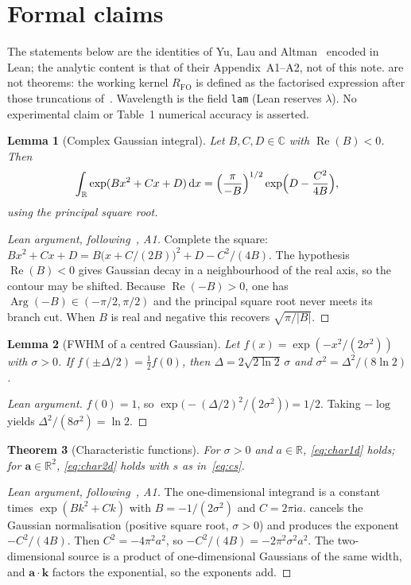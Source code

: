 \documentclass[11pt,a4paper]{article}
\newtheorem{theorem}{Theorem}[section]
\newtheorem{lemma}[theorem]{Lemma}
\theoremstyle{definition}
\theoremstyle{remark}
\DeclareMathOperator{\ReOp}{Re}
\DeclareMathOperator{\Arg}{Arg}
\newcommand{\R}{\mathbb{R}}
\newcommand{\C}{\mathbb{C}}
\newcommand{\dd}{\mathrm{d}}
\newcommand{\ii}{\mathrm{i}}
\newcommand{\abs}[1]{\lvert#1\rvert}
\newcommand{\RFO}{R_{\mathrm{FO}}}
\begin{document}
\appendix
\section{Formal claims}
\label{app:formal}

The statements below are the identities of Yu, Lau and
Altman~\cite{Yu2019} encoded in Lean; the analytic content is that of
their Appendix~A1--A2, not of this note.
 are not theorems: the working
kernel $\RFO$ is defined as the factorised expression after those
truncations of~\cite{Yu2019}.
Wavelength is the field \texttt{lam} (Lean reserves $\lambda$).
No experimental claim or Table~1 numerical accuracy is asserted.

\begin{lemma}[Complex Gaussian integral]
\label{lem:cgaussian}
Let $B,C,D\in\C$ with $\ReOp(B)<0$. Then
\begin{equation}
\label{eq:cgaussian}
\int_{\R}\exp(Bx^2+Cx+D)\,\dd x
=\Bigl(\frac{\pi}{-B}\Bigr)^{1/2}
\exp\Bigl(D-\frac{C^2}{4B}\Bigr),
\end{equation}
using the principal square root.
\end{lemma}
\begin{proof}[Lean argument, following~\cite{Yu2019}, A1]
Complete the square:
$Bx^2+Cx+D=B\bigl(x+C/(2B)\bigr)^2+D-C^2/(4B)$.
The hypothesis $\ReOp(B)<0$ gives Gaussian decay in a neighbourhood of
the real axis, so the contour may be shifted.
Because $\ReOp(-B)>0$, one has $\Arg(-B)\in(-\pi/2,\pi/2)$ and the
principal square root never meets its branch cut.
When $B$ is real and negative this recovers
$\sqrt{\pi/\abs{B}}$.
\end{proof}

\begin{lemma}[FWHM of a centred Gaussian]
\label{lem:fwhm}
Let $f(x)=\exp(-x^2/(2\sigma^2))$ with $\sigma>0$.
If $f(\pm\Delta/2)=\tfrac12 f(0)$, then
$\Delta=2\sqrt{2\ln 2}\,\sigma$ and
$\sigma^2=\Delta^2/(8\ln 2)$.
\end{lemma}
\begin{proof}[Lean argument]
$f(0)=1$, so $\exp\bigl(-(\Delta/2)^2/(2\sigma^2)\bigr)=1/2$.
Taking $-\log$ yields $\Delta^2/(8\sigma^2)=\ln 2$.
\end{proof}

\begin{theorem}[Characteristic functions]
\label{thm:char}
For $\sigma>0$ and $a\in\R$,
\eqref{eq:char1d} holds; for $\mathbf{a}\in\R^2$,
\eqref{eq:char2d} holds with $s$ as in~\eqref{eq:cs}.
\end{theorem}
\begin{proof}[Lean argument, following~\cite{Yu2019}, A1]
The one-dimensional integrand is a constant times $\exp(Bk^2+Ck)$ with
$B=-1/(2\sigma^2)$ and $C=2\pi\ii a$.
 cancels the Gaussian normalisation (positive
square root, $\sigma>0$) and produces the exponent $-C^2/(4B)$.
Then $C^2=-4\pi^2 a^2$, so $-C^2/(4B)=-2\pi^2\sigma^2 a^2$.
The two-dimensional source is a product of one-dimensional Gaussians
of the same width, and $\mathbf{a}\cdot\mathbf{k}$ factors the
exponential, so the exponents add.
\end{proof}
\end{document}
